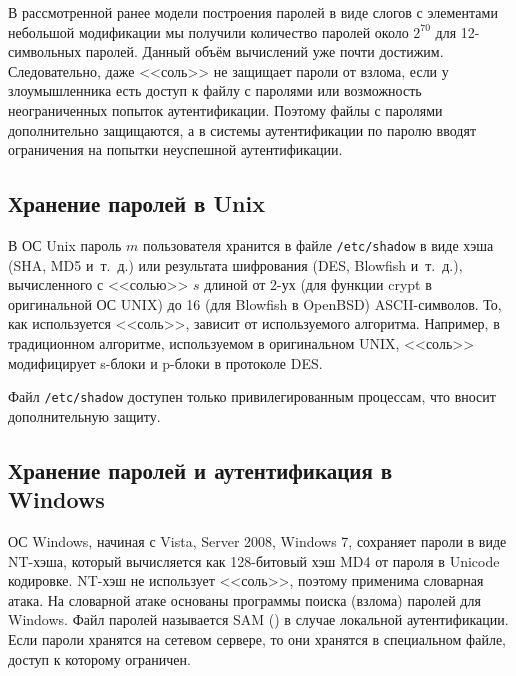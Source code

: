 В рассмотренной ранее модели построения паролей в виде слогов с элементами небольшой модификации мы получили количество паролей около $2^{70}$ для 12-символьных паролей. Данный объём вычислений уже почти достижим. Следовательно, даже <<соль>> не защищает пароли от взлома, если у злоумышленника есть доступ к файлу с паролями или возможность неограниченных попыток аутентификации. Поэтому файлы с паролями дополнительно защищаются, а в системы аутентификации по паролю вводят ограничения на попытки неуспешной аутентификации.

\subsection[Unix]{Хранение паролей в Unix}

В ОС Unix пароль $m$ пользователя хранится в файле \texttt{/etc/shadow} в виде хэша (SHA, MD5 и~т.~д.) или результата шифрования (DES, Blowfish и~т.~д.), вычисленного с <<солью>> $s$ длиной от 2-ух (для функции crypt в оригинальной ОС UNIX) до 16 (для Blowfish в OpenBSD) ASCII-символов. То, как используется <<соль>>, зависит от используемого алгоритма. Например, в традиционном алгоритме, используемом в оригинальном UNIX, <<соль>> модифицирует s-блоки и p-блоки в протоколе DES.

Файл \texttt{/etc/shadow} доступен только привилегированным процессам, что вносит дополнительную защиту.


\subsection[Windows]{Хранение паролей и аутентификация в \protect\\ Windows}


ОС Windows, начиная с Vista, Server 2008, Windows 7, сохраняет пароли в виде NT-хэша, который вычисляется как 128-битовый хэш MD4 от пароля в Unicode кодировке. NT-хэш не использует <<соль>>, поэтому применима словарная атака. На словарной атаке основаны программы поиска (взлома) паролей для Windows. Файл паролей называется SAM () в случае локальной аутентификации. Если пароли хранятся на сетевом сервере, то они хранятся в специальном файле, доступ к которому ограничен.

